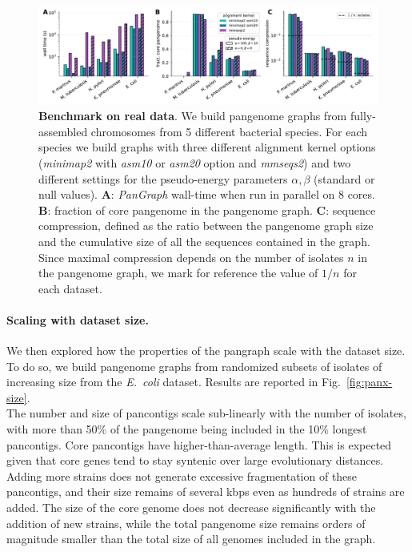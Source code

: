 \documentclass[aps,rmp,preprint,superscriptaddress,10pt,linenumbers]{revtex4-1}
\begin{document}
\begin{figure}[htb]
    \includegraphics[width=\textwidth]{figs/panx_benchmark.pdf}
    \caption{{\bf Benchmark on real data}.
        We build pangenome graphs from fully-assembled chromosomes from 5 different bacterial species. For each species we build graphs with three different alignment kernel options (\textit{minimap2} with \textit{asm10} or \textit{asm20} option and \textit{mmseqs2}) and two different settings for the pseudo-energy parameters $\alpha, \beta$ (standard or null values).
        \textbf{A}: \textit{PanGraph} wall-time when run in parallel on 8 cores.
        \textbf{B}: fraction of core pangenome in the pangenome graph.
        \textbf{C}: sequence compression, defined as the ratio between the pangenome graph size and the cumulative size of all the sequences contained in the graph. Since maximal compression depends on the number of isolates $n$ in the pangenome graph, we mark for reference the value of $1/n$ for each dataset.
    }
    \label{fig:panx-benchmark}
\end{figure}

\paragraph*{Scaling with dataset size.}

We then explored how the properties of the pangraph scale with the dataset size. To do so, we build pangenome graphs from randomized subsets of isolates of increasing size from the \textit{E.~coli} dataset. Results are reported in Fig.~\ref{fig:panx-size}.\\
The number and size of pancontigs scale sub-linearly with the number of isolates, with more than 50\% of the pangenome being included in the 10\% longest pancontigs. Core pancontigs have higher-than-average length. This is expected given that core genes tend to stay syntenic over large evolutionary distances. Adding more strains does not generate excessive fragmentation of these pancontigs, and their size remains of several kbps even as hundreds of strains are added. The size of the core genome does not decrease significantly with the addition of new strains, while the total pangenome size remains orders of magnitude smaller than the total size of all genomes included in the graph.
\end{document}
